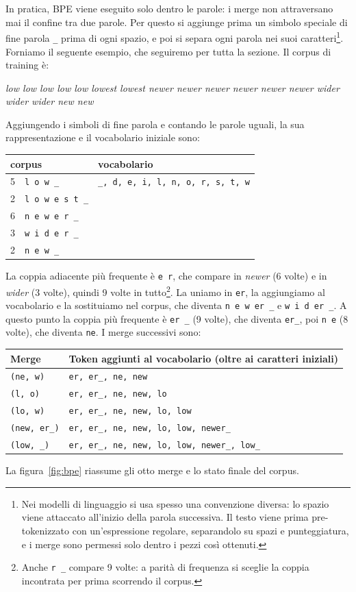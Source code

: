 In pratica, BPE viene eseguito solo dentro le parole: i merge non attraversano mai il confine tra due parole. Per questo si aggiunge prima un simbolo speciale di fine parola \texttt{\_} prima di ogni spazio, e poi si separa ogni parola nei suoi caratteri\footnote{Nei modelli di linguaggio si usa spesso una convenzione diversa: lo spazio viene attaccato all'inizio della parola successiva. Il testo viene prima pre-tokenizzato con un'espressione regolare, separandolo su spazi e punteggiatura, e i merge sono permessi solo dentro i pezzi così ottenuti.}. Forniamo il seguente esempio, che seguiremo per tutta la sezione. Il corpus di training è:
\begin{center}
\textit{low low low low low lowest lowest newer newer newer newer newer newer wider wider wider new new}
\end{center}
Aggiungendo i simboli di fine parola e contando le parole uguali, la sua rappresentazione e il vocabolario iniziale sono:
\begin{center}
\begin{tabular}{rl@{\qquad}l}
\toprule
\multicolumn{2}{l}{corpus} & vocabolario \\
\midrule
5 & \texttt{l o w \_} & \texttt{\_, d, e, i, l, n, o, r, s, t, w} \\
2 & \texttt{l o w e s t \_} & \\
6 & \texttt{n e w e r \_} & \\
3 & \texttt{w i d e r \_} & \\
2 & \texttt{n e w \_} & \\
\bottomrule
\end{tabular}
\end{center}

La coppia adiacente più frequente è \texttt{e r}, che compare in \textit{newer} (6 volte) e in \textit{wider} (3 volte), quindi 9 volte in tutto\footnote{Anche \texttt{r \_} compare 9 volte: a parità di frequenza si sceglie la coppia incontrata per prima scorrendo il corpus.}. La uniamo in \texttt{er}, la aggiungiamo al vocabolario e la sostituiamo nel corpus, che diventa \texttt{n e w er \_} e \texttt{w i d er \_}. A questo punto la coppia più frequente è \texttt{er \_} (9 volte), che diventa \texttt{er\_}, poi \texttt{n e} (8 volte), che diventa \texttt{ne}. I merge successivi sono:
\begin{center}
\small
\begin{tabular}{@{}ll@{}}
\toprule
Merge & Token aggiunti al vocabolario (oltre ai caratteri iniziali) \\
\midrule
\texttt{(ne, w)} & \texttt{er, er\_, ne, new} \\
\texttt{(l, o)} & \texttt{er, er\_, ne, new, lo} \\
\texttt{(lo, w)} & \texttt{er, er\_, ne, new, lo, low} \\
\texttt{(new, er\_)} & \texttt{er, er\_, ne, new, lo, low, newer\_} \\
\texttt{(low, \_)} & \texttt{er, er\_, ne, new, lo, low, newer\_, low\_} \\
\bottomrule
\end{tabular}
\end{center}
La figura~\ref{fig:bpe} riassume gli otto merge e lo stato finale del corpus.

